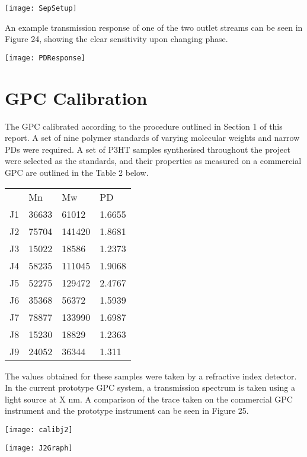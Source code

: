\texttt{[image: SepSetup]}

An example transmission response of one of the two outlet streams can be seen in Figure 24, showing the clear sensitivity upon changing phase. 

\texttt{[image: PDResponse]}

\section{GPC Calibration}

The GPC calibrated according to the procedure outlined in Section 1 of this report. A set of nine polymer standards of varying molecular weights and narrow PDs were required. A set of P3HT samples synthesised throughout the project were selected as the standards, and their properties as measured on a commercial GPC are outlined in the Table 2 below.

\begin{table}[]
	\begin{tabular}{llll}
		& Mn    & Mw     & PD     \\
		J1 & 36633 & 61012  & 1.6655 \\
		J2 & 75704 & 141420 & 1.8681 \\
		J3 & 15022 & 18586  & 1.2373 \\
		J4 & 58235 & 111045 & 1.9068 \\
		J5 & 52275 & 129472 & 2.4767 \\
		J6 & 35368 & 56372  & 1.5939 \\
		J7 & 78877 & 133990 & 1.6987 \\
		J8 & 15230 & 18829  & 1.2363 \\
		J9 & 24052 & 36344  & 1.311 
	\end{tabular}
\end{table}

The values obtained for these samples were taken by a refractive index detector. In the current prototype GPC system, a transmission spectrum is taken using a light source at X nm. A comparison of the trace taken on the commercial GPC instrument and the prototype instrument can be seen in Figure 25.

\texttt{[image: calibj2]}

\texttt{[image: J2Graph]}

